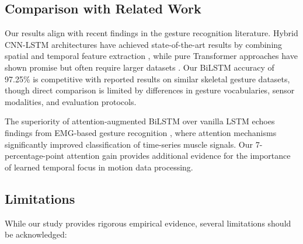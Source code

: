 \documentclass[conference]{IEEEtran}
\begin{document}
\subsection{Comparison with Related Work}
Our results align with recent findings in the gesture recognition literature. Hybrid CNN-LSTM architectures have achieved state-of-the-art results by combining spatial and temporal feature extraction \cite{miah2024}, while pure Transformer approaches have shown promise but often require larger datasets \cite{abavisani2024}. Our BiLSTM accuracy of 97.25\% is competitive with reported results on similar skeletal gesture datasets, though direct comparison is limited by differences in gesture vocabularies, sensor modalities, and evaluation protocols.

The superiority of attention-augmented BiLSTM over vanilla LSTM echoes findings from EMG-based gesture recognition \cite{liu2023}, where attention mechanisms significantly improved classification of time-series muscle signals. Our 7-percentage-point attention gain provides additional evidence for the importance of learned temporal focus in motion data processing.

\subsection{Limitations}
While our study provides rigorous empirical evidence, several limitations should be acknowledged:
\end{document}
